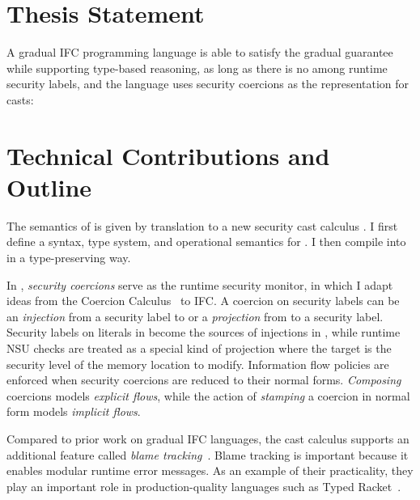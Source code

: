 \section{Thesis Statement}


A gradual IFC programming language is able to satisfy the gradual guarantee
while supporting type-based reasoning, as long as there is no \unk among runtime
security labels, and the language uses security coercions as the representation
for casts:

\vspace{20pt}


\section{Technical Contributions and Outline}

The semantics of \Surface is given by translation to a new security cast
calculus \CC. I first define a syntax, type system, and operational semantics
for \CC. I then compile \Surface into \CC in a type-preserving way.

In \CC, \textit{security coercions} serve as the runtime security monitor, in
which I adapt ideas from the Coercion
Calculus~\parencite{Henglein:1994nz,Herman:2010aa} to IFC. A coercion on
security labels can be an \textit{injection} from a security label to \unk or a
\textit{projection} from \unk to a security label. Security labels on literals
in \Surface become the sources of injections in \CC, while runtime NSU checks
are treated as a special kind of projection where the target is the security
level of the memory location to modify. Information flow policies are enforced
when security coercions are reduced to their normal forms. \textit{Composing}
coercions models \textit{explicit flows}, while the action of \textit{stamping}
a coercion in normal form models \textit{implicit flows}.

Compared to prior work on gradual IFC languages, the \CC cast calculus supports
an additional feature called \textit{blame tracking}~\parencite{Findler:2002eu}.
Blame tracking is important because it enables modular runtime error messages.
As an example of their practicality, they play an important role in
production-quality languages such as Typed
Racket~\parencite{Tobin-Hochstadt:2008lr,Preston-Tunnell-Wilson:2018aa}.

